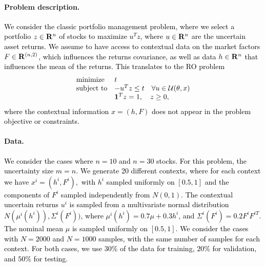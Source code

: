 \documentclass[11pt]{article}
\newcommand{\RC}[1]{\textcolor{black}{#1}}
\begin{document}
\paragraph{Problem description.}
\RC{We consider the classic portfolio management problem, where we select a portfolio $z \in {\mathbf R}^n$ of stocks to maximize $u^T z$, where $u\in {\mathbf R}^n$ are the uncertain asset returns.
We assume to have access to contextual data on the market factors $F \in {\mathbf R}^{(n,2)}$, which influences the returns covariance, as well as data $h\in {\mathbf R}^n$ that influences the mean of the returns. 
This translates to the \gls{RO} problem  
\begin{equation*}
	\begin{array}{ll}
		\mbox{minimize} & t\\
		\mbox{subject to} & -u^Tz \le t \quad \forall u \in {\mathcal{U}}(\theta,x) \\
		& \mathbf 1^Tz = 1, \quad z \geq 0,
	\end{array}
\end{equation*}
where the contextual information $x = (h, F)$ does not appear in the problem objective or constraints.} 


\paragraph{Data.}
\RC{We consider the cases where $n = 10$ and $n=30$ stocks. For this problem, the uncertainty size $m = n$. 
We generate 20 different contexts, where for each context we have $x^i = (h^i,F^i),$ with $h^i$ sampled uniformly on $[0.5,1]$ and the components of $F^i$ sampled independently from $N(0,1)$.}
\RC{
The contextual uncertain returns $u^i$ is sampled from a multivariate normal distribution $N(\mu^i(h^i)), \Sigma^i(F^i))$, where $\mu^i(h^i) = 0.7\mu +0.3h^i$, and $\Sigma^i(F^i) = 0.2F^iF^{iT}$. The nominal mean $\mu$ is sampled uniformly on $[0.5,1]$. 
We consider the cases with $N=2000$ and $N=1000$ samples, with the same number of samples for each context. For both cases, we use $30\%$ of the data for training, $20\%$ for validation, and $50\%$ for testing.}
\end{document}
